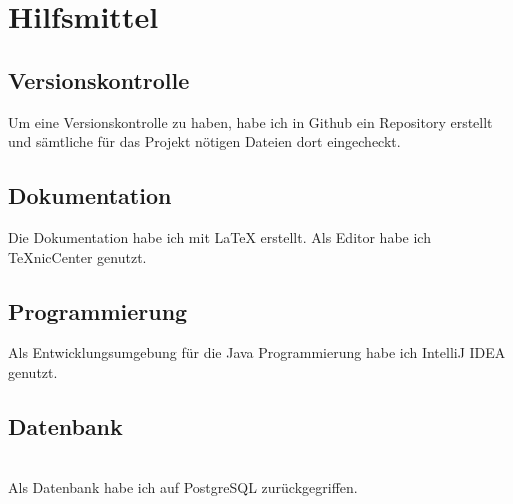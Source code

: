 \section{Hilfsmittel}

\subsection{Versionskontrolle}
Um eine Versionskontrolle zu haben, habe ich in Github \cite{Github} ein Repository erstellt und sämtliche für das Projekt nötigen Dateien dort eingecheckt.

\subsection{Dokumentation}
Die Dokumentation habe ich mit \LaTeX{} erstellt. Als Editor habe ich TeXnicCenter \cite{TeXnicCenter} genutzt.

\subsection{Programmierung}
Als Entwicklungsumgebung für die Java Programmierung habe ich IntelliJ IDEA \cite{IntelliJ} genutzt.

\subsection{Datenbank}
\\Als Datenbank habe ich auf PostgreSQL \cite{Postgres} zurückgegriffen.
